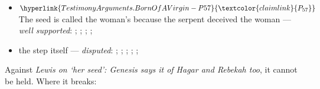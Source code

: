 \documentclass[11pt]{article}
\newcommand{\pvar}[2]{\hyperlink{#1-P#2}{\textcolor{claimlink}{P_{#2}}}}
\begin{document}
\begin{itemize}
\begin{itemize}
\item \(\pvar{TestimonyArguments.BornOfAVirgin}{57}\) The seed is called the woman’s because the serpent deceived the woman --- \emph{well supported}: \cite[165]{leupold-exposition-genesis-1942}; \cite[169]{leupold-exposition-genesis-1942}; \cite[170]{calvin-commentary-genesis-1847}; \cite[ad loc. Gen 3:15]{henry-commentary-whole-bible}; \cite[102]{keil-delitzsch-pentateuch-1866}
\item the step itself --- \emph{disputed}: \cite[169]{leupold-exposition-genesis-1942}; \cite[101--102]{keil-delitzsch-pentateuch-1866}; \cite[170]{calvin-commentary-genesis-1847}; \cite[III.23.7]{irenaeus-against-heresies-180}; \cite[V.21.1]{irenaeus-against-heresies-180}; \cite[ad loc. Gen 3:15]{henry-commentary-whole-bible}
\end{itemize}
\end{itemize}
Against \emph{Lewis on ‘her seed’: Genesis says it of Hagar and Rebekah too}, it cannot be held. Where it breaks:
\end{document}
